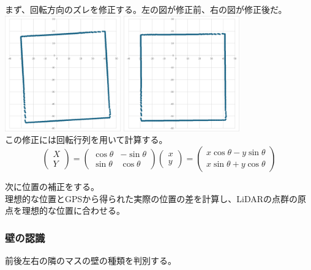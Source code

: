 \documentclass[dvipdfmx,a4paper]{jsarticle}
\begin{document}
    \noindent
    まず、回転方向のズレを修正する。左の図が修正前、右の図が修正後だ。\\
    \includegraphics[width=50mm]{Photo/LiDAR/3-1.png}
    \includegraphics[width=50mm]{Photo/LiDAR/3-2.png}\\
    この修正には回転行列を用いて計算する。
    $$
    \begin{pmatrix}
    X\\
    Y
    \end{pmatrix}
    =
    \begin{pmatrix}
    \cos\theta & -\sin\theta \\
    \sin\theta & \cos\theta
    \end{pmatrix}
    \begin{pmatrix}
    x\\
    y
    \end{pmatrix}
    =
    \begin{pmatrix}
    x\cos\theta - y\sin\theta \\
    x\sin\theta + y\cos\theta
    \end{pmatrix}
    $$

    \noindent
    次に位置の補正をする。\\
    理想的な位置とGPSから得られた実際の位置の差を計算し、LiDARの点群の原点を理想的な位置に合わせる。

    \subsubsection{壁の認識}
    \noindent
    前後左右の隣のマスの壁の種類を判別する。
    
\end{document}
